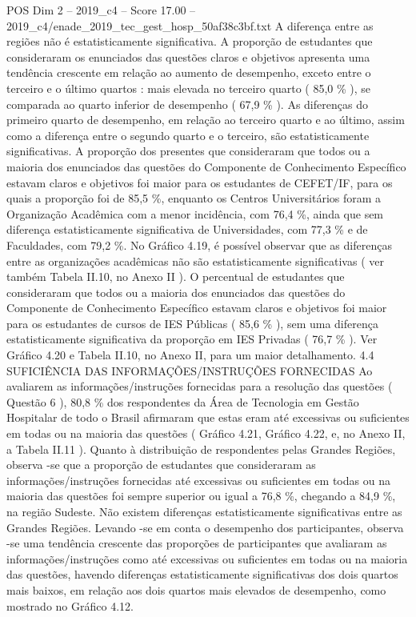 \begin{textsample}{POS Dim 2 – 2019\_c4 – Score 17.00 – 2019\_c4/enade\_2019\_tec\_gest\_hosp\_50af38c3bf.txt}
A diferença entre as regiões não é estatisticamente significativa.
A proporção de estudantes que consideraram os enunciados das questões claros e objetivos apresenta uma tendência crescente em relação ao aumento de desempenho, exceto entre o terceiro e o último quartos : mais elevada no terceiro quarto ( 85,0 \% ), se comparada ao quarto inferior de desempenho ( 67,9 \% ).
As diferenças do primeiro quarto de desempenho, em relação ao terceiro quarto e ao último, assim como a diferença entre o segundo quarto e o terceiro, são estatisticamente significativas.
A proporção dos presentes que consideraram que todos ou a maioria dos enunciados das questões do Componente de Conhecimento Específico estavam claros e objetivos foi maior para os estudantes de CEFET/IF, para os quais a proporção foi de 85,5 \%, enquanto os Centros Universitários foram a Organização Acadêmica com a menor incidência, com 76,4 \%, ainda que sem diferença estatisticamente significativa de Universidades, com 77,3 \% e de Faculdades, com 79,2 \%.
No Gráfico 4.19, é possível observar que as diferenças entre as organizações acadêmicas não são estatisticamente significativas ( ver também Tabela II.10, no Anexo II ).
O percentual de estudantes que consideraram que todos ou a maioria dos enunciados das questões do Componente de Conhecimento Específico estavam claros e objetivos foi maior para os estudantes de cursos de IES Públicas ( 85,6 \% ), sem uma diferença estatisticamente significativa da proporção em IES Privadas ( 76,7 \% ).
Ver Gráfico 4.20 e Tabela II.10, no Anexo II, para um maior detalhamento. 4.4 SUFICIÊNCIA DAS INFORMAÇÕES/INSTRUÇÕES FORNECIDAS Ao avaliarem as informações/instruções fornecidas para a resolução das questões ( Questão 6 ), 80,8 \% dos respondentes da Área de Tecnologia em Gestão Hospitalar de todo o Brasil afirmaram que estas eram até excessivas ou suficientes em todas ou na maioria das questões ( Gráfico 4.21, Gráfico 4.22, e, no Anexo II, a Tabela II.11 ).
Quanto à distribuição de respondentes pelas Grandes Regiões, observa -se que a proporção de estudantes que consideraram as informações/instruções fornecidas até excessivas ou suficientes em todas ou na maioria das questões foi sempre superior ou igual a 76,8 \%, chegando a 84,9 \%, na região Sudeste.
Não existem diferenças estatisticamente significativas entre as Grandes Regiões.
Levando -se em conta o desempenho dos participantes, observa -se uma tendência crescente das proporções de participantes que avaliaram as informações/instruções como até excessivas ou suficientes em todas ou na maioria das questões, havendo diferenças estatisticamente significativas dos dois quartos mais baixos, em relação aos dois quartos mais elevados de desempenho, como mostrado no Gráfico 4.12.

\end{textsample}
